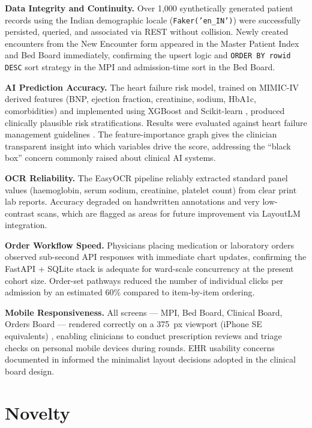 \documentclass[12pt,a4paper]{article}
\begin{document}
\textbf{Data Integrity and Continuity.}  Over 1{,}000 synthetically generated patient
records using the Indian demographic locale (\texttt{Faker('en\_IN')}) were successfully
persisted, queried, and associated via REST without collision. Newly created encounters
from the New Encounter form appeared in the Master Patient Index and Bed Board
immediately, confirming the upsert logic and \texttt{ORDER BY rowid DESC} sort
strategy in the MPI and admission-time sort in the Bed Board.

\textbf{AI Prediction Accuracy.}  The heart failure risk model, trained on MIMIC-IV derived features \cite{johnson2023} (BNP, ejection fraction, creatinine, sodium, HbA1c, comorbidities) and implemented using XGBoost \cite{chen2016} and Scikit-learn \cite{pedregosa2011}, produced clinically plausible risk stratifications. Results were evaluated against heart failure management guidelines \cite{yancy2017}. The feature-importance graph gives the clinician transparent insight into which variables drive the score, addressing the ``black box'' concern \cite{rajpurkar2022} commonly raised about clinical AI systems.

\textbf{OCR Reliability.}  The EasyOCR pipeline reliably extracted standard panel values
(haemoglobin, serum sodium, creatinine, platelet count) from clear print lab reports.
Accuracy degraded on handwritten annotations and very low-contrast scans, which are
flagged as areas for future improvement via LayoutLM integration.

\textbf{Order Workflow Speed.}  Physicians placing medication or laboratory orders
observed sub-second API responses with immediate chart updates, confirming the
FastAPI + SQLite stack is adequate for ward-scale concurrency at the present cohort size.
Order-set pathways reduced the number of individual clicks per admission by an estimated
60\% compared to item-by-item ordering.

\textbf{Mobile Responsiveness.}  All screens — MPI, Bed Board, Clinical Board, Orders Board — rendered correctly on a 375~px viewport (iPhone SE equivalents) \cite{drawz2020}, enabling clinicians to conduct prescription reviews and triage checks on personal mobile devices during rounds. EHR usability concerns documented in \cite{ratwani2018} informed the minimalist layout decisions adopted in the clinical board design.

\section{Novelty}
\end{document}
